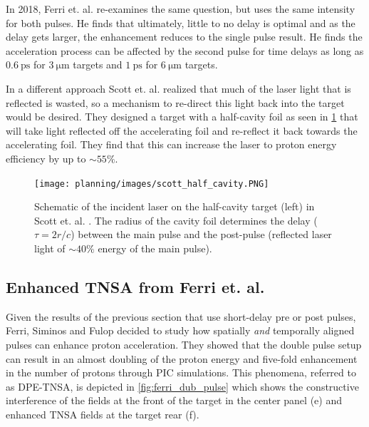In 2018, Ferri et. al. \cite{Ferri_2018_PoP} re-examines the same question, but uses the same intensity for both pulses. He finds that ultimately, little to no delay is optimal and as the delay gets larger, the enhancement reduces to the single pulse result. He finds the acceleration process can be affected by the second pulse for time delays as long as $\SI{0.6}{\pico \second}$ for $\SI{3}{\micro \meter}$ targets and $\SI{1}{\pico \second}$ for $\SI{6}{\micro \meter}$ targets. 

In a different approach Scott et. al. \cite{Scott_2012_APL} realized that much of the laser light that is reflected is wasted, so a mechanism to re-direct this light back into the target would be desired. They designed a target with a half-cavity foil as seen in \cref{fig:scott_half_cavity} that will take light reflected off the accelerating foil and re-reflect it back towards the accelerating foil. They find that this can increase the laser to proton energy efficiency by up to $\sim 55 \%$.

\begin{figure}
	\centering 
	\texttt{[image: planning/images/scott\_half\_cavity.PNG]}
	\caption{Schematic of the incident laser on the half-cavity target (left) in Scott et. al. \cite{Scott_2012_APL}. The radius of the cavity foil determines the delay ($\tau = 2 r/c$) between the main pulse and the post-pulse (reflected laser light of $\sim 40 \%$ energy of the main pulse).}
	\label{fig:scott_half_cavity}
\end{figure}



\subsection{Enhanced TNSA from Ferri et. al.}

Given the results of the previous section \cite{Markey_2010_PRL,Scott_2012_APL,Ferri_2018_PoP} that use short-delay pre or post pulses, Ferri, Siminos and Fulop decided to study how spatially \emph{and} temporally aligned pulses can enhance proton acceleration. They showed that the double pulse setup can result in an almost doubling of the proton energy and five-fold enhancement in the number of protons \cite{Ferri_2019_Nat_Comm} through \gls{PIC} simulations. This phenomena, referred to as \gls{DPE-TNSA}, is depicted in \cref{fig:ferri_dub_pulse} which shows the constructive interference of the fields at the front of the target in the center panel (e) and enhanced \gls{TNSA} fields at the target rear (f).

